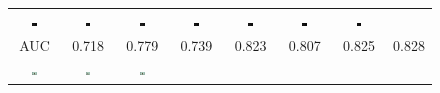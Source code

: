 \begin{figure} [tb]
\begin{tabular*}{\textwidth}{cccccccc}
 \includegraphics[width=0.12\textwidth]{./SR4VT/fig/ed/119082[2-Bicubic]_cbd.jpg} &
 \includegraphics[width=0.12\textwidth]{./SR4VT/fig/ed/119082[3-Zeyde]_cbd.jpg} &
 \includegraphics[width=0.12\textwidth]{./SR4VT/fig/ed/119082[4-ANR]_cbd.jpg} &
 \includegraphics[width=0.12\textwidth]{./SR4VT/fig/ed/119082[5-SRCNN]_cbd.jpg} &
 \includegraphics[width=0.12\textwidth]{./SR4VT/fig/ed/119082[6-A+]_cbd.jpg} &
 \includegraphics[width=0.12\textwidth]{./SR4VT/fig/ed/119082[7-JOR]_cbd.jpg} &
 \includegraphics[width=0.12\textwidth]{./SR4VT/fig/ed/119082[8-SRF]_cbd.jpg} \\
    AUC & 0.718 & 0.779 & 0.739 & 0.823 & 0.807 & 0.825 & 0.828 \\
 \includegraphics[width=0.12\textwidth]{./SR4VT/fig/ed/42049[1-Original].jpg} &
 \includegraphics[width=0.12\textwidth]{./SR4VT/fig/ed/42049[2-Bicubic].jpg} &
 \includegraphics[width=0.12\textwidth]{./SR4VT/fig/ed/42049[3-Zeyde].jpg} &

\end{tabular*}
\end{figure}
